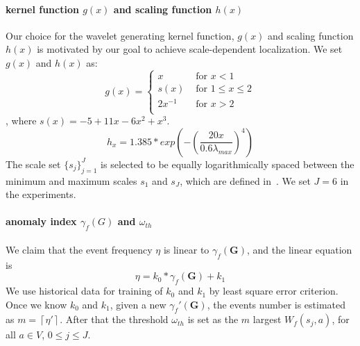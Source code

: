 \documentclass[conference]{IEEEtran}
\begin{document}
\paragraph{kernel function $g(x)$ and scaling function $h(x)$}
Our choice for the wavelet generating kernel function, $g(x)$ and scaling function $h(x)$ is motivated by our goal to achieve scale-dependent localization. We set $g(x)$ and $h(x)$ as:
\begin{equation}
g(x) = \left\{ \begin{array}{rl}
 x &\mbox{ for $x<1$} \\
s(x) &\mbox{ for $1\leq x \leq 2$} \\
 2x^{-1} &\mbox{ for $x>2$} \\
       \end{array} \right.
\end{equation}, where $s(x)=-5+11x-6x^2+x^3$.
\begin{equation}
h_{x}= 1.385*exp(-(\frac{20x}{0.6\lambda_{max}})^4)
\end{equation}
The scale set $\{s_j\}_{j=1}^J$ is selected to be equally logarithmically spaced between the minimum and maximum scales $s_1$ and $s_J$, which are defined in~\cite{hammond2011wavelets}. We set $J=6$ in the experiments.

\paragraph{anomaly index $\gamma_f(G)$ and $\omega_{th}$}
We claim that the event frequency $\eta$ is linear to $\gamma_f(\mathbf{G})$, and the linear equation is
\begin{equation}
\label{eq:linear_equation}
\eta = k_0*\gamma_f(\mathbf{G}) + k_1
\end{equation}We use historical data for training of $k_0$ and $k_1$ by least square error criterion. Once we know
$k_0$ and $k_1$, given a new $\gamma_f'(\mathbf{G})$, the events number is estimated as $m=\left \lceil \eta' \right \rceil$. After that the threshold $\omega_{th}$ is set as the $m$ largest $W_f(s_j,a)$, for all $a\in V$, $0\le j \le J$.
\end{document}

